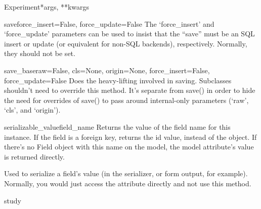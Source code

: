 \documentclass[letterpaper,10pt,english]{sphinxmanual}
\begin{document}
\begin{classdesc}{Experiment}{*args, **kwargs}
\begin{methoddesc}[Experiment]{save}{force\_insert=False, force\_update=False}
The `force\_insert' and `force\_update' parameters can be used to insist
that the ``save'' must be an SQL insert or update (or equivalent for
non-SQL backends), respectively. Normally, they should not be set.
\end{methoddesc}

\hypertarget{data.models.Experiment.save_base}{}\begin{methoddesc}[Experiment]{save\_base}{raw=False, cls=None, origin=None, force\_insert=False, force\_update=False}
Does the heavy-lifting involved in saving. Subclasses shouldn't need to
override this method. It's separate from save() in order to hide the
need for overrides of save() to pass around internal-only parameters
(`raw', `cls', and `origin').
\end{methoddesc}

\hypertarget{data.models.Experiment.serializable_value}{}\begin{methoddesc}[Experiment]{serializable\_value}{field\_name}
Returns the value of the field name for this instance. If the field is
a foreign key, returns the id value, instead of the object. If there's
no Field object with this name on the model, the model attribute's
value is returned directly.

Used to serialize a field's value (in the serializer, or form output,
for example). Normally, you would just access the attribute directly
and not use this method.
\end{methoddesc}

\hypertarget{data.models.Experiment.study}{}\begin{memberdesc}[Experiment]{study}\end{memberdesc}
\end{classdesc}
\end{document}

